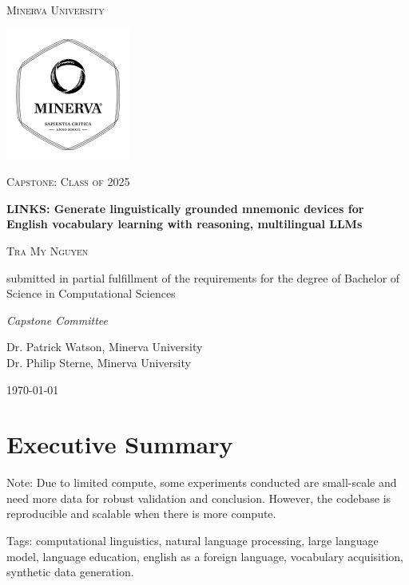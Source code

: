 
\begin{titlepage}
\centering
{\scshape\LARGE Minerva University \par}
\vspace{1cm}
\begin{center}
    \includegraphics[width = 0.4\linewidth]{figures/minerva_logo.pdf}
\end{center}
{\scshape\Large Capstone: Class of 2025 \par}
\vspace{1.5cm}
{\huge\bfseries LINKS: Generate linguistically grounded mnemonic devices for English vocabulary learning with reasoning, multilingual LLMs \par}
\vspace{2cm}
{\scshape\large Tra My Nguyen \par}

\vfill
submitted in partial fulfillment of the requirements for the degree of Bachelor of Science in Computational Sciences \par
\vspace{2cm}
{\large\itshape Capstone Committee \par}
Dr. Patrick Watson, Minerva University \\
Dr. Philip Sterne, Minerva University
\vspace{2cm}
{\large \today\par}
\end{titlepage}

\onecolumn
\section*{Executive Summary}
Note: Due to limited compute, some experiments conducted are small-scale and need more data for robust validation and conclusion. However, the codebase is reproducible and scalable when there is more compute.

Tags: computational linguistics, natural language processing, large language model, language education, english as a foreign language, vocabulary acquisition, synthetic data generation.

\clearpage
